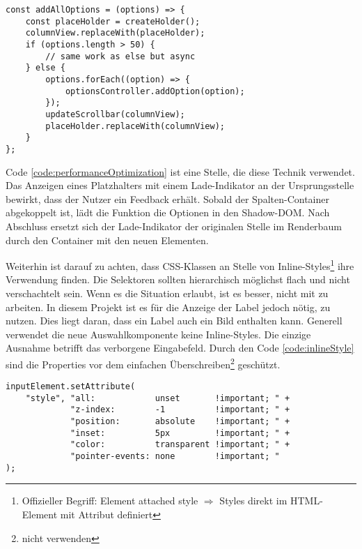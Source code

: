 \begin{lstlisting}[style = htmlcssjs, caption = Performance Optimierung (aus \codestyle{columnOptionsComponent.js}), label = code:performanceOptimization]
const addAllOptions = (options) => {
    const placeHolder = createHolder();
    columnView.replaceWith(placeHolder);
    if (options.length > 50) {
        // same work as else but async
    } else {
        options.forEach((option) => {
            optionsController.addOption(option);
        });
        updateScrollbar(columnView);
        placeHolder.replaceWith(columnView);
    }
};
\end{lstlisting}

Code \ref{code:performanceOptimization} ist eine Stelle, die diese Technik verwendet. 
Das Anzeigen eines Platzhalters mit einem Lade-Indikator an der Ursprungsstelle bewirkt, dass der Nutzer ein Feedback erhält. 
Sobald der Spalten-Container abgekoppelt ist, lädt die Funktion die Optionen in den Shadow-DOM. 
Nach Abschluss ersetzt sich der Lade-Indikator der originalen Stelle im Renderbaum durch den Container mit den neuen Elementen. 

Weiterhin ist darauf zu achten, dass CSS-Klassen an Stelle von Inline-Styles\footnote{
    Offizieller Begriff: Element attached style $\Rightarrow$ Styles direkt im HTML-Element mit Attribut  definiert
} ihre Verwendung finden. 
Die Selektoren sollten hierarchisch möglichst flach und nicht verschachtelt sein. 
Wenn es die Situation erlaubt, ist es besser, nicht mit  zu arbeiten. 
In diesem Projekt ist es für die Anzeige der Label jedoch nötig,  zu nutzen. 
Dies liegt daran, dass ein Label auch ein Bild enthalten kann. 
Generell verwendet die neue Auswahlkomponente keine Inline-Styles. 
Die einzige Ausnahme betrifft das verborgene Eingabefeld. 
Durch den Code \ref{code:inlineStyle} sind die Properties vor dem einfachen Überschreiben\footnote{
     nicht verwenden
} geschützt. 

\begin{lstlisting}[style = htmlcssjs, caption = Inline-Style für Input-Feld, label = code:inlineStyle]
inputElement.setAttribute(
    "style", "all:            unset       !important; " +
             "z-index:        -1          !important; " +
             "position:       absolute    !important; " +
             "inset:          5px         !important; " +
             "color:          transparent !important; " +
             "pointer-events: none        !important; "
);
\end{lstlisting}

